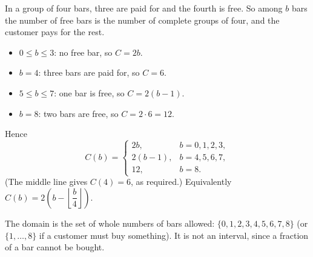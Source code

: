 In a group of four bars, three are paid for and the fourth is free. So among $b$ bars the number of free bars is the number of complete groups of four, and the customer pays for the rest.
\begin{itemize}
\item $0\le b\le3$: no free bar, so $C=2b$.
\item $b=4$: three bars are paid for, so $C=6$.
\item $5\le b\le7$: one bar is free, so $C=2(b-1)$.
\item $b=8$: two bars are free, so $C=2\cdot6=12$.
\end{itemize}
Hence
\[
C(b)=\begin{cases}2b, & b=0,1,2,3,\\ 2(b-1), & b=4,5,6,7,\\ 12, & b=8.\end{cases}
\]
(The middle line gives $C(4)=6$, as required.) Equivalently $C(b)=2\left(b-\left\lfloor\dfrac {b}{4}\right\rfloor\right)$.

The domain is the set of whole numbers of bars allowed: $\boxed{\{0,1,2,3,4,5,6,7,8\}}$ (or $\{1,\dots,8\}$ if a customer must buy something). It is not an interval, since a fraction of a bar cannot be bought.
